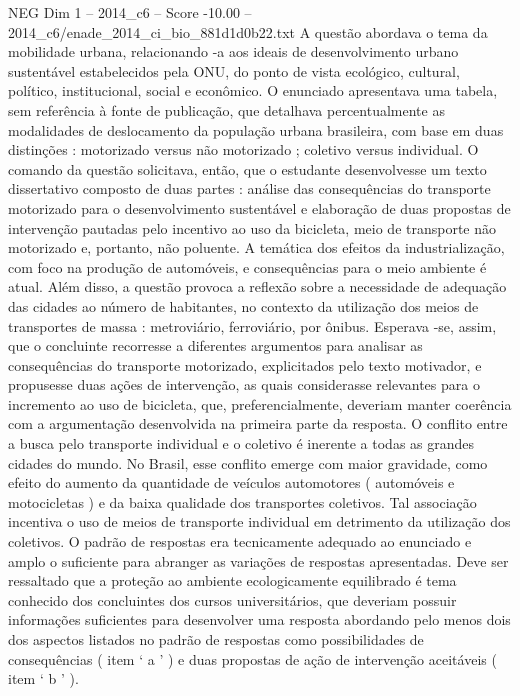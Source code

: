 \begin{textsample}{NEG Dim 1 – 2014\_c6 – Score -10.00 – 2014\_c6/enade\_2014\_ci\_bio\_881d1d0b22.txt}
A questão abordava o tema da mobilidade urbana, relacionando -a aos ideais de desenvolvimento urbano sustentável estabelecidos pela ONU, do ponto de vista ecológico, cultural, político, institucional, social e econômico.
O enunciado apresentava uma tabela, sem referência à fonte de publicação, que detalhava percentualmente as modalidades de deslocamento da população urbana brasileira, com base em duas distinções : motorizado versus não motorizado ; coletivo versus individual.
O comando da questão solicitava, então, que o estudante desenvolvesse um texto dissertativo composto de duas partes : análise das consequências do transporte motorizado para o desenvolvimento sustentável e elaboração de duas propostas de intervenção pautadas pelo incentivo ao uso da bicicleta, meio de transporte não motorizado e, portanto, não poluente.
A temática dos efeitos da industrialização, com foco na produção de automóveis, e consequências para o meio ambiente é atual.
Além disso, a questão provoca a reflexão sobre a necessidade de adequação das cidades ao número de habitantes, no contexto da utilização dos meios de transportes de massa : metroviário, ferroviário, por ônibus.
Esperava -se, assim, que o concluinte recorresse a diferentes argumentos para analisar as consequências do transporte motorizado, explicitados pelo texto motivador, e propusesse duas ações de intervenção, as quais considerasse relevantes para o incremento ao uso de bicicleta, que, preferencialmente, deveriam manter coerência com a argumentação desenvolvida na primeira parte da resposta.
O conflito entre a busca pelo transporte individual e o coletivo é inerente a todas as grandes cidades do mundo.
No Brasil, esse conflito emerge com maior gravidade, como efeito do aumento da quantidade de veículos automotores ( automóveis e motocicletas ) e da baixa qualidade dos transportes coletivos.
Tal associação incentiva o uso de meios de transporte individual em detrimento da utilização dos coletivos.
O padrão de respostas era tecnicamente adequado ao enunciado e amplo o suficiente para abranger as variações de respostas apresentadas.
Deve ser ressaltado que a proteção ao ambiente ecologicamente equilibrado é tema conhecido dos concluintes dos cursos universitários, que deveriam possuir informações suficientes para desenvolver uma resposta abordando pelo menos dois dos aspectos listados no padrão de respostas como possibilidades de consequências ( item ‘ a ’ ) e duas propostas de ação de intervenção aceitáveis ( item ‘ b ’ ).

\end{textsample}
